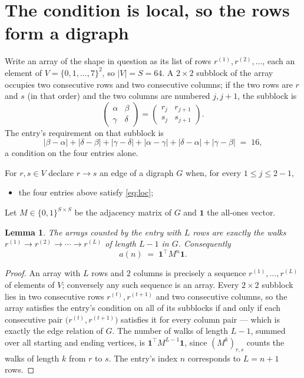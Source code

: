 \documentclass[11pt,a4paper]{article}
\theoremstyle{plain}
\newtheorem{lemma}[theorem]{Lemma}
\theoremstyle{definition}
\begin{document}
\section{The condition is local, so the rows form a digraph}

Write an array of the shape in question as its list of rows
$r^{(1)},r^{(2)},\dots$, each an element of
$V=\{0,1,\dots,7\}^{2}$, so $|V|=S=64$. A $2\times2$ subblock of the array
occupies two consecutive rows and two consecutive columns; if the two rows are $r$
and $s$ (in that order) and the two columns are numbered $j,j+1$,
the subblock is
\[
\begin{pmatrix}\alpha&\beta\\\gamma&\delta\end{pmatrix}=\begin{pmatrix}r_j&r_{j+1}\\s_j&s_{j+1}\end{pmatrix}.
\]
The entry's requirement on that subblock is
\begin{equation}\label{eq:loc}
|\beta-\alpha|+|\delta-\beta|+|\gamma-\delta|+|\alpha-\gamma|+|\delta-\alpha|+|\gamma-\beta|\;=\;16,
\end{equation}
a condition on the four entries alone.

For $r,s\in V$ declare $r\to s$ an edge of a digraph $G$ when, for every
$1\le j\le 2-1$,
\begin{itemize}
\item the four entries above satisfy \eqref{eq:loc};

\end{itemize}
Let $M\in\{0,1\}^{S\times S}$ be the adjacency matrix of $G$ and $\mathbf{1}$ the
all-ones vector.

\begin{lemma}\label{lem:walk}
The arrays counted by the entry with $L$ rows are exactly the walks
$r^{(1)}\to r^{(2)}\to\cdots\to r^{(L)}$ of length $L-1$ in $G$. Consequently
\[
a(n)\;=\;\mathbf{1}^{\!\top}M^{n}\mathbf{1} .
\]
\end{lemma}

\begin{proof}
An array with $L$ rows and $2$ columns is precisely a sequence
$r^{(1)},\dots,r^{(L)}$ of elements of $V$; conversely any such sequence is an array.
Every $2\times2$ subblock lies in two consecutive rows $r^{(t)},r^{(t+1)}$ and two
consecutive columns, so the array satisfies the entry's condition on all of its subblocks
if and only if each consecutive pair $\bigl(r^{(t)},r^{(t+1)}\bigr)$ satisfies it for
every column pair --- which is exactly the edge relation of $G$. The number of walks of
length $L-1$, summed over all starting and ending vertices, is
$\mathbf{1}^{\!\top}M^{L-1}\mathbf{1}$, since $(M^{k})_{r,s}$ counts the walks of
length $k$ from $r$ to $s$. The entry's index $n$ corresponds to $L=n+1$ rows.
\end{proof}
\end{document}
